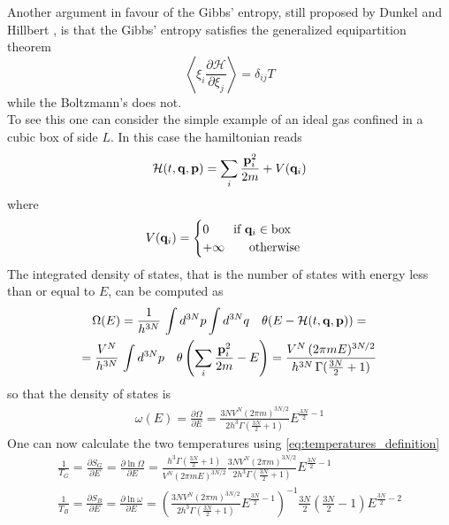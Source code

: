 Another argument in favour of the Gibbs' entropy, still proposed by Dunkel and Hillbert \cite{Dunkel_Hillbert}, is that the Gibbs' entropy satisfies the generalized equipartition theorem
\begin{equation}
    \left\langle\xi_{i} \frac{\partial \mathcal{H}}{\partial \xi_{j}}\right\rangle=\delta_{i j} T
    \label{eq:equipartition}
\end{equation}
while the Boltzmann's does not.  \\
To see this one can consider the simple example of an ideal gas confined in a cubic box of side $L$. In this case the hamiltonian reads 
\begin{equation*}
    \mathcal{H}(t,\mathbf{q},\mathbf{p}) = \sum_i \frac{\mathbf{p}_i^2}{2m} + V(\mathbf{q}_i)
\end{equation*}
where 
\begin{equation*}
    V(\mathbf{q}_i) = 
    \begin{cases}
        0 \qquad \text{if } \mathbf{q}_i \in \text{box} \\
        +\infty \qquad \text{otherwise}
    \end{cases}
\end{equation*}
The integrated density of states, that is the number of states with energy less than or equal to $E$, can be computed as 
\begin{gather*}
    \Omega(E) = \frac{1}{h^{3N}} \, \int d^{3N}p \int d^{3N}q \quad \theta(E-\mathcal{H}(t, \mathbf{q}, \mathbf{p})) = \\ = \frac{V^N}{h^{3N}} \, \int d^{3N}p \quad \theta\left(\sum_i \frac{\mathbf{p}_i^2}{2m}- E\right) 
    = \frac{V^N \, (2\pi mE)^{3N/2}}{h^{3N} \, \Gamma(\frac{3N}{2}+1)}
\end{gather*}
so that the density of states is 
\begin{gather*}
    \omega(E)=\frac{\partial \Omega}{\partial E}=\frac{3 N V^{N}(2 \pi m)^{3 N / 2}}{2 h^{3} \Gamma\left(\frac{3 N}{2}+1\right)} E^{\frac{3 N}{2}-1}
\end{gather*}
One can now calculate the two temperatures using \ref{eq:temperatures_definition}
\begin{gather*}
    \frac{1}{T_{G}}=\frac{\partial S_{G}}{\partial E}=\frac{\partial \ln \Omega}{\partial E}=\frac{h^{3} \Gamma\left(\frac{3 N}{2}+1\right)}{V^{N}(2 \pi m E)^{3 N / 2}} \frac{3 N V^{N}(2 \pi m)^{3 N / 2}}{2 h^{3} \Gamma\left(\frac{3 N}{2}+1\right)} E^{\frac{3 N}{2}-1} \\
    \frac{1}{T_{B}}=\frac{\partial S_{B}}{\partial E}=\frac{\partial \ln \omega}{\partial E}=\left(\frac{3 N V^{N}(2 \pi m)^{3 N / 2}}{2 h^{3} \Gamma\left(\frac{3 N}{2}+1\right)} E^{\frac{3 N}{2}-1}\right)^{-1} \frac{3 N}{2}\left(\frac{3 N}{2}-1\right) E^{\frac{3 N}{2}-2}
\end{gather*}

